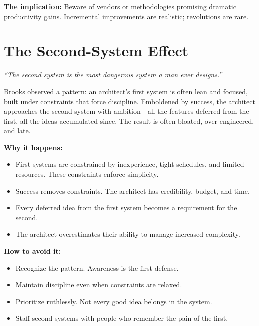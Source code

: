 \documentclass[11pt, letterpaper]{article}
\begin{document}
\textbf{The implication:} Beware of vendors or methodologies promising dramatic productivity gains. Incremental improvements are realistic; revolutions are rare.

\vspace{1em}

\section*{The Second-System Effect}

\begin{center}
\textit{``The second system is the most dangerous system a man ever designs.''}
\end{center}

\vspace{0.5em}

Brooks observed a pattern: an architect's first system is often lean and focused, built under constraints that force discipline. Emboldened by success, the architect approaches the second system with ambition---all the features deferred from the first, all the ideas accumulated since. The result is often bloated, over-engineered, and late.

\textbf{Why it happens:}

\begin{itemize}
    \item First systems are constrained by inexperience, tight schedules, and limited resources. These constraints enforce simplicity.
    \item Success removes constraints. The architect has credibility, budget, and time.
    \item Every deferred idea from the first system becomes a requirement for the second.
    \item The architect overestimates their ability to manage increased complexity.
\end{itemize}

\textbf{How to avoid it:}

\begin{itemize}
    \item Recognize the pattern. Awareness is the first defense.
    \item Maintain discipline even when constraints are relaxed.
    \item Prioritize ruthlessly. Not every good idea belongs in the system.
    \item Staff second systems with people who remember the pain of the first.
\end{itemize}
\end{document}
